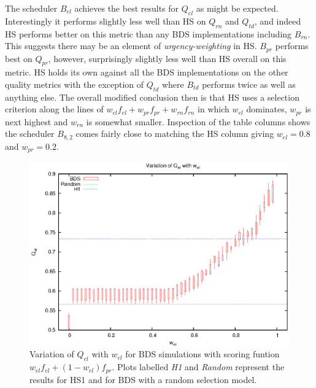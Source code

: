 The scheduler $B_{el}$ achieves the best results for $Q_{el}$ as might be expected. Interestingly it performs slightly less well than HS on $Q_{rn}$ and $Q_{td}$, and indeed HS performs better on this metric than any BDS implementations including $B_{rn}$. This suggests there may be an element of \emph{urgency-weighting} in HS. $B_{pr}$ performs best on $Q_{pr}$, however, surprisingly slightly less well than HS overall on this metric. HS holds its own against all the BDS implementations on the other quality metrics with the exception of $Q_{td}$ where $B_{td}$ performs twice as well as anything else. The overall modified conclusion then is that HS uses a selection criterion along the lines of $w_{el}f_{el}+w_{pr}f_{pr}+w_{rn}f_{rn}$ in which $w_{el}$ dominates, $w_{pr}$ is next highest and $w_{rn}$ is somewhat smaller. Inspection of the table columns shows the scheduler $B_{8,2}$ comes fairly close to matching the HS column giving $w_{el}=0.8$ and $w_{pr}=0.2$.



\begin{figure}[htbp]
  \begin{center}
    \includegraphics[scale=1.0, angle=0]{figures/cmp_el.eps}
  \end{center}
  \caption[Variation of $Q_{el}$ with $w_{el}$ for BDS simulations.]
  {Variation of $Q_{el}$ with $w_{el}$ for BDS simulations with scoring funtion $w_{el}f_{el}+(1-w_{el})f_{pr}$. Plots labelled \emph{H1} and \emph{Random} represent the results for HS1 and for BDS with a random selection model.}
  \label{fig:bdsqel}
\end{figure}
  
